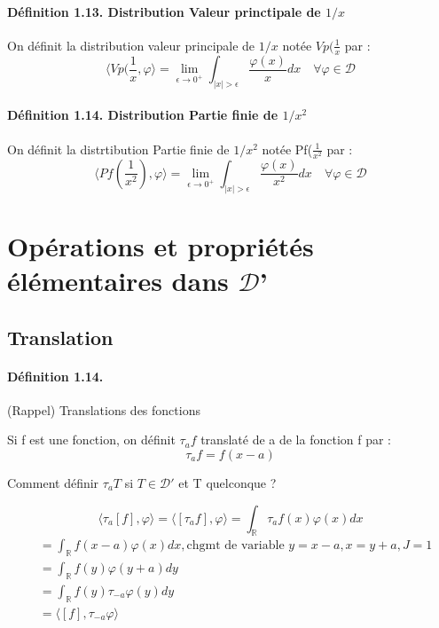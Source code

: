 \documentclass[12pt,a4paper]{report}
\newcommand{\ens}[1]{\mathbb{#1}}
\newcommand{\fphi}{\quad \forall \varphi \in \mathcal{D}}
\newcommand{\D}{\ensuremath{\mathcal{D}}}
\begin{document}
\paragraph{Définition 1.13. Distribution Valeur princtipale de \(1/x\)}

On définit la distribution valeur principale de \(1/x\) notée \(Vp(\frac{1}{x}\) par :
\[
	\langle Vp(\frac{1}{x}, \varphi \rangle = \lim_{\epsilon \rightarrow 0^+} \int_{\vert x \vert > \epsilon} \dfrac{\varphi(x)}{x}dx \fphi
\]

\paragraph{Définition 1.14. Distribution Partie finie de \(1/x^2\)}

On définit la distrtibution Partie finie de \(1/x^2\) notée Pf(\(\frac{1}{x^2}\) par :
\[
	\langle Pf\left(\frac{1}{x^2}\right), \varphi \rangle = \lim_{\epsilon \rightarrow 0^+} \int_{\vert x \vert > \epsilon} \dfrac{\varphi(x)}{x^2}dx \fphi
\]

\section{Opérations et propriétés élémentaires dans \D'}

\subsection{Translation}
\paragraph{Définition 1.14.} (Rappel) Translations des fonctions

Si f est une fonction, on définit \(\tau_af\) translaté de a de la fonction f par :
\[
	\tau_af = f(x - a)
\]

Comment définir \(\tau_a T\) si \(T \in \D'\) et T quelconque ?

\[
	\langle \tau_a [f], \varphi \rangle = \langle [\tau_a f], \varphi \rangle = \int_{\ens{R}} \tau_a f(x) \varphi(x) dx
\]
\begin{align*}
	&= \int_{\ens{R}} f(x-a) \varphi(x) dx, \text{chgmt de variable } y = x - a, x = y + a, J = 1\\
	&= \int_{\ens{R}} f(y) \varphi(y+a) dy\\
	&= \int_{\ens{R}} f(y) \tau_{-a} \varphi(y) dy\\
	&= \langle [f], \tau_{-a}\varphi \rangle
\end{align*}
\end{document}

